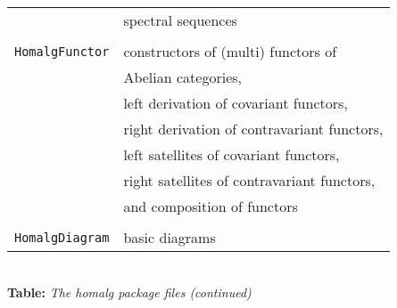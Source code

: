 \documentclass[a4paper,11pt]{report}
\begin{document}
{{\begin{center}
\begin{tabular}{l|l}
&
spectral sequences\\
&
\\
\texttt{HomalgFunctor}&
constructors of (multi) functors of\\
&
Abelian categories,\\
&
left derivation of covariant functors,\\
&
right derivation of contravariant functors,\\
&
left satellites of covariant functors,\\
&
right satellites of contravariant functors,\\
&
and composition of functors\\
&
\\
\texttt{HomalgDiagram}&
basic diagrams\\
\end{tabular}\\[2mm]
\textbf{Table: }\emph{The \textsf{homalg} package files (continued)}\end{center}

 }

 
}
\end{document}

